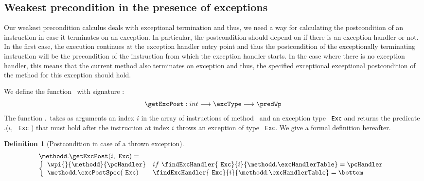 \newtheorem{defExc}{Definition}[subsection]
\newtheorem{defExcRuntime}[defExc]{Definition}%
\subsection{Weakest precondition in the presence of exceptions } \label{wp:Exc} %
Our weakest precondition calculus deals with exceptional termination and thus, we need
a way for calculating the postcondition of an instruction in  case it terminates on an exception.
In particular, the postcondition should depend on if there is an exception handler or not. 
In the first case, the execution continues at the exception handler entry point and thus
 the postcondition of the exceptionally terminating instruction will be the precondition 
of the instruction from which the exception handler starts. In the case where there is no exception handler,
 this means that the current method also terminates on exception and thus, the specified exceptional exceptional
postcondition of the method for this exception should hold.

We define the function \getExcPost \  with signature :
 $$\getExcPost : int   \longrightarrow \excType \longrightarrow  \predWp  $$
The function \methodd.\getExcPost \ 
takes as arguments an index $i$ in the array of instructions of method \methodd \ and an exception type
 \mbox{ \rm \texttt{Exc}}  and returns the predicate \methodd.\getExcPost($i$, \mbox{ \rm \texttt{Exc}}   )
  that must hold after the instruction at index $i$ throws an exception of type \mbox{ \rm \texttt{Exc}}. We give a formal definition hereafter.


\begin{defExc}[Postcondition in case of a thrown exception]\label{defExc}
$$  \begin{array}{l}
           \methodd.\getExcPost(i, \mbox{ \rm \texttt{Exc}}   ) = \\
   \left\{\begin{array}{ll}
        \wpi{}{\methodd}{\pcHandler}   & if \  \findExcHandler{\mbox{ \rm \texttt{Exc}} }{i}{\methodd.\excHandlerTable} = \pcHandler \\
	\methodd.\excPostSpec( \mbox{ \rm \texttt{Exc}}  ) & \findExcHandler{\mbox{ \rm \texttt{Exc}} }{i}{\methodd.\excHandlerTable} = \bottom 
  \end{array}\right.
\end{array}
$$
\end{defExc}

